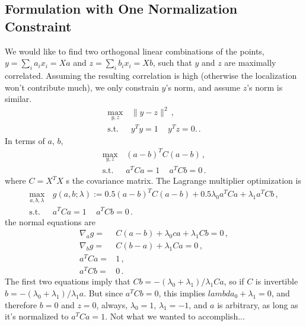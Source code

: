 \documentclass[11pt]{article}
\begin{document}
\subsection{Formulation with One Normalization Constraint}
We would like to find two orthogonal linear combinations of the points, $y = \sum_i a_i x_i = X a$ and $z = \sum_i b_i x_i = X b$, such that $y$ and $z$ are maximally correlated. Assuming the resulting correlation is high (otherwise the localization won't contribute much), we only constrain $y$'s norm, and assume $z$'s norm is similar.
\begin{equation}
    \begin{aligned}
       \max_{y,z}\, & \|y - z\|^2\,,\\
        \text{s.t.}\, & y^T y = 1\,\quad y^T z = 0.\,.
    \end{aligned}
\end{equation}
In terms of $a$, $b$, 
\begin{equation}
    \begin{aligned}
       \max_{y,z}\, & (a - b)^T C (a - b)\,,\\
        \text{s.t.}\, & a^T C a = 1\,\quad a^T C b = 0\,.
    \end{aligned}
\end{equation}
where $C = X^T X$ s the covariance matrix. The Lagrange multiplier optimization is
\begin{equation}
    \begin{aligned}
       \max_{a,b,\lambda}\, & g(a,b;\lambda) := 0.5 (a - b)^T C (a - b) + 0.5 \lambda_0 a^T C a +
       \lambda_1 a^T C b\,,\\
        \text{s.t.}\, & a^T C a = 1\,\quad a^T C b = 0\,.
    \end{aligned}
\end{equation}
the normal equations are
\begin{equation}
    \begin{aligned}
       \nabla_{a} g = & C(a - b) + \lambda_0 c a + \lambda_1 C b = 0 \,,\\
       \nabla_{b} g = & C(b - a) + \lambda_1 C a = 0 \,,\\
        a^T C a = & 1\,,\\
        a^T C b = & 0\,.
    \end{aligned}
\end{equation}
The first two equations imply that $C b = -(\lambda_0 + \lambda_1)/\lambda_1 C a$, so if $C$ is invertible $b = -(\lambda_0 + \lambda_1)/\lambda_1 a$. But since $a^T C b = 0$, this implies $lambda_0 + \lambda_1 = 0$, and therefore $b = 0$ and $z = 0$, always, $\lambda_0 = 1$, $\lambda_1 = -1$, and $a$ is arbitrary, as long as it's normalized to $a^T C a = 1$. Not what we wanted to accomplish...
\end{document}
